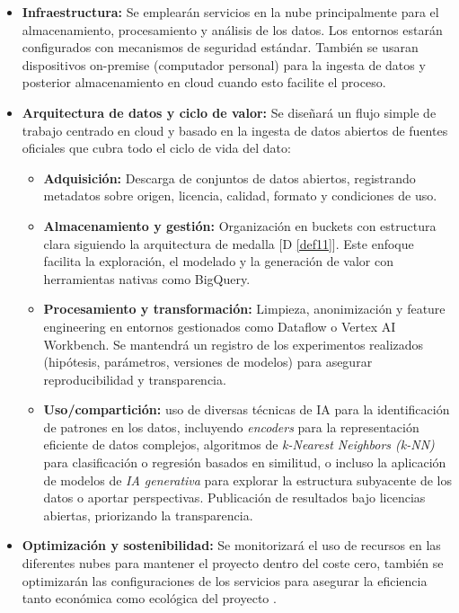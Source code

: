 \begin{itemize}
	\item \textbf{Infraestructura:} Se emplearán servicios en la nube principalmente para el almacenamiento, procesamiento y análisis de los datos. Los entornos estarán configurados con mecanismos de seguridad estándar. También se usaran dispositivos on-premise (computador personal) para la ingesta de datos y posterior almacenamiento en cloud cuando esto facilite el proceso.

	\item \textbf{Arquitectura de datos y ciclo de valor:} Se diseñará un flujo simple de trabajo centrado en cloud y basado en la ingesta de datos abiertos de fuentes oficiales que cubra todo el ciclo de vida del dato: 
	\begin{itemize}
		\item \textbf{Adquisición:} Descarga de conjuntos de datos abiertos, registrando metadatos sobre origen, licencia, calidad, formato y condiciones de uso. 
		\item \textbf{Almacenamiento y gestión:} Organización en buckets con estructura clara siguiendo la arquitectura de medalla [D \ref{def11}]. Este enfoque facilita la exploración, el modelado y la generación de valor con herramientas nativas como BigQuery.
		\item \textbf{Procesamiento y transformación:} Limpieza, anonimización y feature engineering en entornos gestionados como Dataflow o Vertex AI Workbench. Se mantendrá un registro de los experimentos realizados (hipótesis, parámetros, versiones de modelos) para asegurar reproducibilidad y transparencia.
		\item \textbf{Uso/compartición:} uso de diversas técnicas de IA para la identificación de patrones en los datos, incluyendo \textit{encoders} para la representación eficiente de datos complejos, algoritmos de \textit{k-Nearest Neighbors (k-NN)} para clasificación o regresión basados en similitud, o incluso la aplicación de modelos de \textit{IA generativa} para explorar la estructura subyacente de los datos o aportar perspectivas. Publicación de resultados bajo licencias abiertas, priorizando la transparencia.
	\end{itemize}
	
	\item \textbf{Optimización y sostenibilidad:} Se monitorizará el uso de recursos en las diferentes nubes para mantener el proyecto dentro del coste cero, también se optimizarán las configuraciones de los servicios para asegurar la eficiencia tanto económica como ecológica del proyecto .
\end{itemize}




